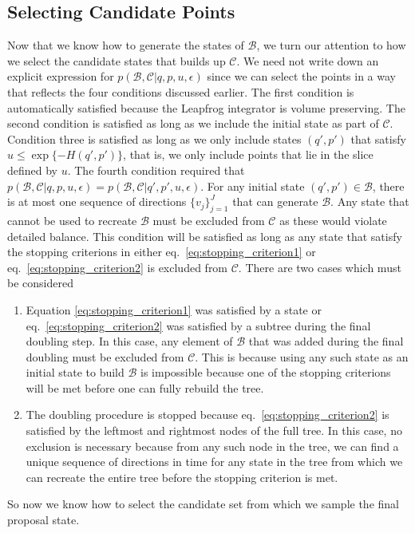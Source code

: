 \subsection{Selecting Candidate Points}
Now that we know how to generate the states of $\mathcal{B}$, we turn our attention to how we select the candidate states that builds up $\mathcal{C}$. 
We need not write down an explicit expression for $p(\mathcal{B}, \mathcal{C}|q, p, u, \epsilon)$ since we can select the points in a way that reflects the four conditions discussed earlier. The first condition is automatically satisfied because the Leapfrog integrator is volume preserving. The second condition is satisfied as long as we include the initial state as part of $\mathcal{C}$. Condition three is satisfied as long as we only include states $(q', p')$ that satisfy $u \leq \exp\{-H(q', p')\}$, that is, we only include points that lie in the slice defined by $u$. The fourth condition required that $p(\mathcal{B}, \mathcal{C}|q, p, u, \epsilon) = p(\mathcal{B}, \mathcal{C}|q', p', u, \epsilon)$. For any initial state $(q', p') \in \mathcal{B}$, there is at most one sequence of directions $\{v_j\}_{j=1}^J$ that can generate $\mathcal{B}$. Any state that cannot be used to recreate $\mathcal{B}$ must be excluded from $\mathcal{C}$ as these would violate detailed balance. This condition will be satisfied as long as any state that satisfy the stopping criterions in either eq.~\eqref{eq:stopping_criterion1} or eq.~\eqref{eq:stopping_criterion2} is excluded from $\mathcal{C}$. There are two cases which must be considered
\begin{enumerate}
    \item Equation \eqref{eq:stopping_criterion1} was satisfied by a state or eq.~\eqref{eq:stopping_criterion2} was satisfied by a subtree during the final doubling step. In this case, any element of $\mathcal{B}$ that was added during the final doubling must be excluded from $\mathcal{C}$. This is because using any such state as an initial state to build $\mathcal{B}$ is impossible because one of the stopping criterions will be met before one can fully rebuild the tree.
    \item The doubling procedure is stopped because eq.~\eqref{eq:stopping_criterion2} is satisfied by the leftmost and rightmost nodes of the full tree. In this case, no exclusion is necessary because from any such node in the tree, we can find a unique sequence of directions in time for any state in the tree from which we can recreate the entire tree before the stopping criterion is met.
\end{enumerate}
So now we know how to select the candidate set from which we sample the final proposal state. 





